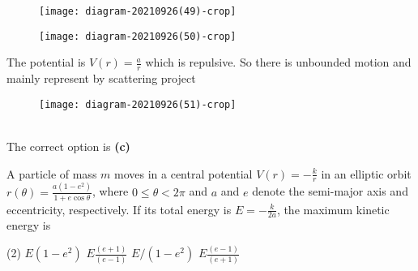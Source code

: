 \begin{enumerate}
\begin{tasks}
	\task[\textbf{C.}]\begin{figure}[H]
		\centering
		\texttt{[image: diagram-20210926(49)-crop]}
	\end{figure}
	\task[\textbf{D.}]\begin{figure}[H]
		\centering
		\texttt{[image: diagram-20210926(50)-crop]}
	\end{figure}
\end{tasks}
\begin{answer}
\begin{minipage}{0.5\textwidth}
	 The potential is $V(r)=\frac{a}{r}$ which is repulsive. So there is unbounded motion and mainly represent by scattering project
\end{minipage}
\begin{minipage}{0.5\textwidth}
\begin{figure}[H]
	\centering
	\texttt{[image: diagram-20210926(51)-crop]}
\end{figure}
\end{minipage}\\
The correct option is \textbf{(c)}
\end{answer}
\begin{minipage}{\textwidth}
	\item A particle of mass $m$ moves in a central potential $V(r)=-\frac{k}{r}$ in an elliptic orbit $r(\theta)=\frac{a\left(1-e^{2}\right)}{1+e \cos \theta}$, where $0 \leq \theta<2 \pi$ and $a$ and $e$ denote the semi-major axis and eccentricity, respectively. If its total energy is $E=-\frac{k}{2 a}$, the maximum kinetic energy is
\end{minipage}
\begin{tasks}(2)
	\task[\textbf{A.}] $E\left(1-e^{2}\right)$
	\task[\textbf{B.}]$E \frac{(e+1)}{(e-1)}$
	\task[\textbf{C.}]$E /\left(1-e^{2}\right)$
	\task[\textbf{D.}]$E \frac{(e-1)}{(e+1)}$
\end{tasks}
\begin{answer}



\end{answer}
\end{enumerate}
